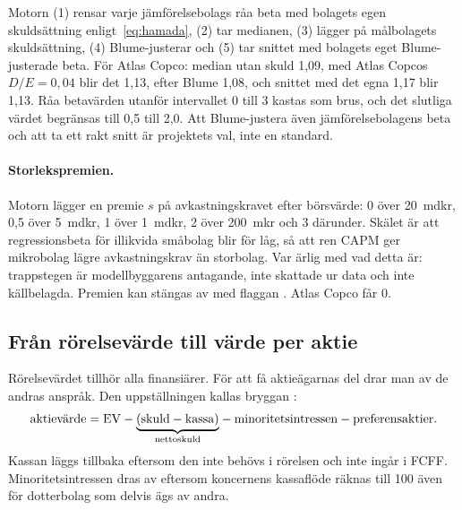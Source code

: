 \begin{imotorn}
Motorn (1) rensar varje jämförelsebolags råa beta med bolagets egen skuldsättning
enligt~\eqref{eq:hamada}, (2) tar medianen, (3) lägger på målbolagets skuldsättning, (4)
Blume-justerar och (5) tar snittet med bolagets eget Blume-justerade beta. För Atlas Copco:
median utan skuld 1,09, med Atlas Copcos $D/E = 0,04$ blir det 1,13, efter Blume 1,08, och
snittet med det egna 1,17 blir 1,13. Råa betavärden utanför intervallet 0 till 3 kastas som
brus, och det slutliga värdet begränsas till 0,5 till 2,0. Att Blume-justera även
jämförelsebolagens beta och att ta ett rakt snitt är projektets val, inte en standard.
\end{imotorn}

\paragraph{Storlekspremien.} Motorn lägger en premie $s$ på avkastningskravet efter börsvärde:
0\pct{} över 20~mdkr, 0,5\pct{} över 5~mdkr, 1\pct{} över 1~mdkr, 2\pct{} över 200~mkr och 3\pct{}
därunder. Skälet är att regressionsbeta för illikvida småbolag blir för låg, så att ren CAPM
ger mikrobolag lägre avkastningskrav än storbolag. Var ärlig med vad detta är: trappstegen är
modellbyggarens antagande, inte skattade ur data och inte källbelagda. Premien kan stängas av
med flaggan . Atlas Copco får 0\pct.

\subsection{Från rörelsevärde till värde per aktie}
\label{sec:brygga}

Rörelsevärdet tillhör alla finansiärer. För att få aktieägarnas del drar man av de andras
anspråk. Den uppställningen kallas bryggan :
\begin{equation}
  \text{aktievärde} = \mathrm{EV} - {\underbrace{(\text{skuld} - \text{kassa})}_{\text{nettoskuld}}}
    - \text{minoritetsintressen} - \text{preferensaktier}.
  \label{eq:brygga}
\end{equation}
Kassan läggs tillbaka eftersom den inte behövs i rörelsen och inte ingår i FCFF.
Minoritetsintressen  dras av eftersom koncernens kassaflöde
räknas till 100\pct{} även för dotterbolag som delvis ägs av andra.

